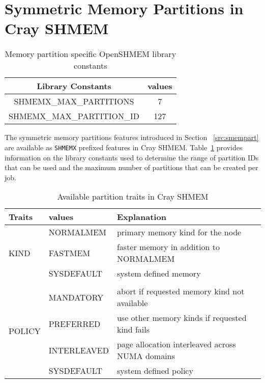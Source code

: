 \section{Symmetric Memory Partitions in Cray SHMEM}
\label{src:implement}
\begin{table}[h!]
\centering
\begin{tabular}{|c c|}\hline
    Library Constants & values \\[0.5ex]
    \hline\hline
    SHMEMX\_MAX\_PARTITIONS & 7 \\
    SHMEMX\_MAX\_PARTITION\_ID & 127 \\
    \hline
\end{tabular}
\caption{Memory partition specific OpenSHMEM library constants}
\label{tab:const}
\end{table}

The symmetric memory partitions features introduced in Section
~\ref{src:smempart} are available as \texttt{SHMEMX} prefixed
features in Cray SHMEM. Table~\ref{tab:const} provides information
on the library constants used to determine the range of partition
IDs that can be used and the maximum number of partitions that can
be created per job.

\begin{table}[h!]
\centering
\begin{tabular}{|l l l|}\hline
    Traits & values & Explanation\\[0.5ex]
    \hline\hline
    \multirow{3}{4em}{KIND} & NORMALMEM  & primary memory kind for
                                           the node \\
                            & FASTMEM    & faster memory in addition
                                           to NORMALMEM \\
                            & SYSDEFAULT & system defined memory \\
                            &&\\
    \multirow{4}{4em}{POLICY} & MANDATORY   & abort if requested memory
                                              kind not available \\
                              & PREFERRED   & use other memory kinds if
                                              requested kind fails \\
                              & INTERLEAVED & page allocation interleaved
                                              across NUMA domains \\
                              & SYSDEFAULT  & system defined policy \\
    \hline
\end{tabular}
\caption{Available partition traits in Cray SHMEM}
\label{tab:trait}
\end{table}

